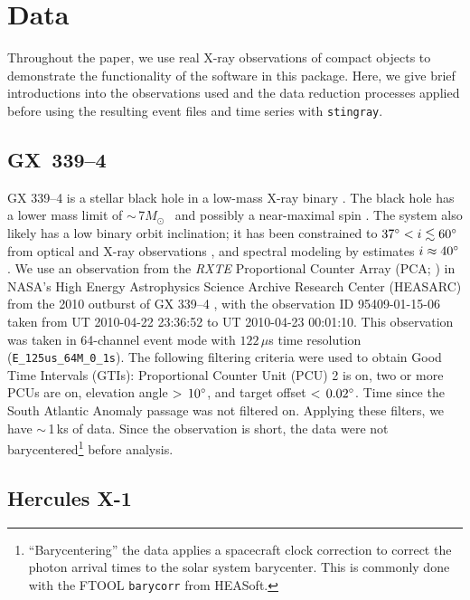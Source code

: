 \documentclass[twocolumn]{aastex62}
\newcommand{\Msun}{\ensuremath{M_\odot}\xspace}
\newcommand{\stingray}{\texttt{stingray}\xspace}
\begin{document}
\section{Data}
\label{sec:data}
Throughout the paper, we use real X-ray observations of compact objects to demonstrate the functionality of the software in this package. 
Here, we give brief introductions into the observations used and the data reduction processes applied before using the resulting event files and time series with \stingray.

\subsection{GX~339--4}
\label{sec:gx339}
GX 339--4 is a stellar black hole in a low-mass X-ray binary \citep{Hynesetal03}. 
The black hole has a lower mass limit of $\sim$\,7\Msun\ \citep{MunozDariasetal08} and possibly a near-maximal spin \citep{Ludlametal15}. 
The system also likely has a low binary orbit inclination; it has been constrained to $37 \degree <i\lesssim 60\degree$ from optical and X-ray observations \citep{Heidaetal17, Zdziarskietal98}, and spectral modeling by \citet{WangJietal18} estimates $i\approx 40\degree$.
We use an observation from the  \textit{RXTE} Proportional Counter Array (PCA; \citealt{Jahodaetal96}) in NASA's High Energy Astrophysics Science Archive Research Center (HEASARC) from the 2010 outburst of GX 339--4 \citep{Yamaokaetal10}, with the observation ID 95409-01-15-06 taken from UT 2010-04-22 23:36:52 to UT 2010-04-23 00:01:10.
This observation was taken in 64-channel event mode with $122\,\mu$s time resolution (\texttt{E\_125us\_64M\_0\_1s}).
The following filtering criteria were used to obtain Good Time Intervals (GTIs): Proportional Counter Unit (PCU) 2 is on, two or more PCUs are on, elevation angle $>\,10\degree$, and target offset $<\,0.02\degree$. 
Time since the South Atlantic Anomaly passage was not filtered on. 
Applying these filters, we have $\sim$\,1\,ks of data. 
Since the observation is short, the data were not barycentered\footnote{\label{foot:bary} ``Barycentering'' the data applies a spacecraft clock correction to correct the photon arrival times to the solar system barycenter. This is commonly done with the FTOOL \texttt{barycorr} from HEASoft.} before analysis.

\subsection{Hercules X-1}
\label{sec:herx1}
\end{document}
